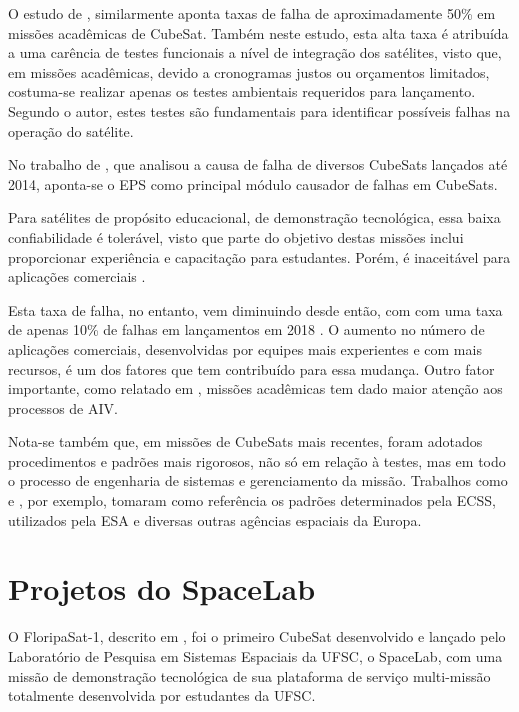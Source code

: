 O estudo de \textcite{first-100-cubesats}, similarmente aponta taxas de falha de aproximadamente 50\% em missões acadêmicas de CubeSat.
Também neste estudo, esta alta taxa é atribuída a uma carência de testes funcionais a nível de integração dos satélites, visto que, em missões acadêmicas, devido a cronogramas justos ou orçamentos limitados, costuma-se realizar apenas os testes ambientais requeridos para lançamento.
Segundo o autor, estes testes são fundamentais para identificar possíveis falhas na operação do satélite.

No trabalho de \textcite{reliability-of-cubesats}, que analisou a causa de falha de diversos CubeSats lançados até 2014, aponta-se o \gls{EPS} como principal módulo causador de falhas em CubeSats.

Para satélites de propósito educacional, de demonstração tecnológica, essa baixa confiabilidade é tolerável, visto que parte do objetivo destas missões inclui proporcionar experiência e capacitação para estudantes.
Porém, é inaceitável para aplicações comerciais \cite{overview-nanosat-test}.

Esta taxa de falha, no entanto, vem diminuindo desde então, com com uma taxa de apenas 10\% de falhas em lançamentos em 2018 \cite{aiv-istsat-1}.
O aumento no número de aplicações comerciais, desenvolvidas por equipes mais experientes e com mais recursos, é um dos fatores que tem contribuído para essa mudança.
Outro fator importante, como relatado em \textcite{aiv-istsat-1}, missões acadêmicas tem dado maior atenção aos processos de \gls{AIV}.

Nota-se também que, em missões de CubeSats mais recentes, foram adotados procedimentos e padrões mais rigorosos, não só em relação à testes, mas em todo o processo de engenharia de sistemas e gerenciamento da missão.
Trabalhos como \textcite{floripasat-1} e \textcite{tailoring-ecss-nanosat}, por exemplo, tomaram como referência os padrões determinados pela \gls{ECSS}, utilizados pela \gls{ESA} e diversas outras agências espaciais da Europa.

\section{Projetos do SpaceLab}\label{sec:intro-spacelab}

O FloripaSat-1, descrito em \textcite{floripasat-1}, foi o primeiro CubeSat desenvolvido e lançado pelo Laboratório de Pesquisa em Sistemas Espaciais da UFSC, o SpaceLab, com uma missão de demonstração tecnológica de sua plataforma de serviço multi-missão totalmente desenvolvida por estudantes da \gls{UFSC}.

